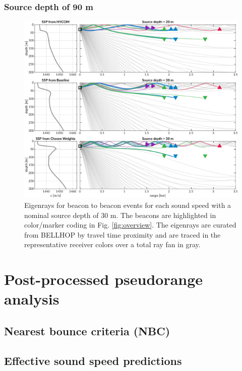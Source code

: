\subsubsection{Source depth of 90 m}
\begin{figure}[h!]
  \centering
  \includegraphics[width=\reprintcolumnwidth]{figs/Fig4.pdf}
  \caption{Eigenrays for beacon to beacon events for each sound speed with a nominal source depth of 30 m. The beacons are highlighted in color/marker coding in Fig. \ref{fig:overview}. The eigenrays are curated from BELLHOP by travel time proximity and are traced in the representative receiver colors over a total ray fan in gray.}
  \label{fig:raytrace-zs90}
\end{figure}

\clearpage
\section{\label{sec:post} Post-processed pseudorange analysis}

\subsection{Nearest bounce criteria (NBC)}

\subsection{Effective sound speed predictions}

